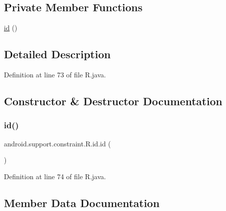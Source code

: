 \subsection*{Private Member Functions}
\begin{DoxyCompactItemize}
\item 
\mbox{\hyperlink{classandroid_1_1support_1_1constraint_1_1_r_1_1id_a0f97781bd09b7d7367d4e392b891e2de}{id}} ()
\end{DoxyCompactItemize}


\subsection{Detailed Description}


Definition at line 73 of file R.\+java.



\subsection{Constructor \& Destructor Documentation}
\mbox{\label{classandroid_1_1support_1_1constraint_1_1_r_1_1id_a0f97781bd09b7d7367d4e392b891e2de}} 
\subsubsection{\texorpdfstring{id()}{id()}}
{\footnotesize\ttfamily android.\+support.\+constraint.\+R.\+id.\+id (\begin{DoxyParamCaption}{ }\end{DoxyParamCaption})\hspace{0.3cm}{\ttfamily [private]}}



Definition at line 74 of file R.\+java.


\begin{DoxyCode}{0}

\end{DoxyCode}


\subsection{Member Data Documentation}
\mbox{\label{classandroid_1_1support_1_1constraint_1_1_r_1_1id_aac6970b85d00403c4068ba6add94397e}} 
